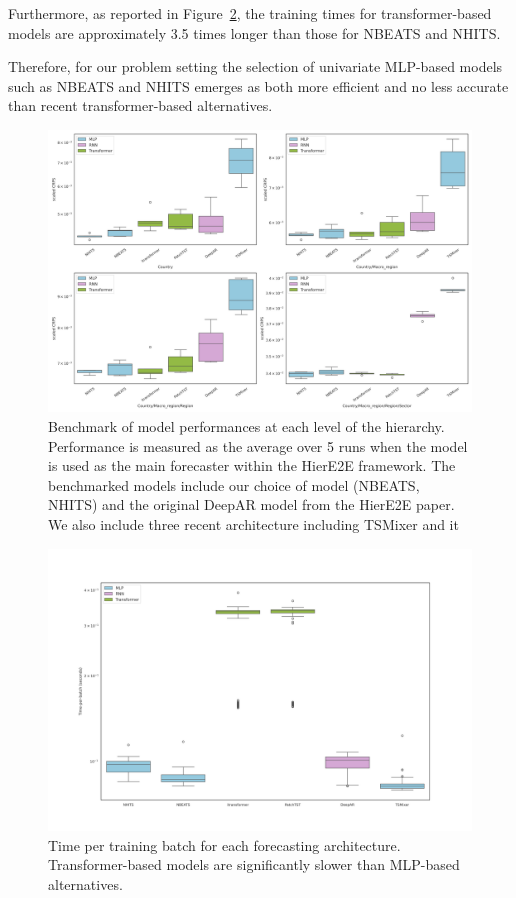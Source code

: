 \documentclass[letterpaper]{article}
\begin{document}
 Furthermore, as reported in Figure~\ref{fig:training_time_comparison}, the training times for transformer-based models are approximately 3.5 times longer than those for NBEATS and NHITS.

Therefore, for our problem setting the selection of univariate MLP-based models such as NBEATS and NHITS emerges as both more efficient and no less accurate than recent transformer-based alternatives.


\begin{figure}[h]
    \centering
    \includegraphics[width=\linewidth]{perf_HierE2E_models.png}
    \caption{Benchmark of model performances at each level of the hierarchy. Performance is measured as the average over 5 runs when the model is used as the main forecaster within the HierE2E framework. The benchmarked models include our choice of model (NBEATS, NHITS) and the original DeepAR model from the HierE2E paper. We also include three recent architecture including TSMixer and it}
    \label{fig:crps_model_comparison}
\end{figure}

\begin{figure}[h]
    \centering
    \includegraphics[width=\linewidth]{perf_time_HierE2E.png}
    \caption{Time per training batch for each forecasting architecture. Transformer-based models are significantly slower than MLP-based alternatives.}
    \label{fig:training_time_comparison}
\end{figure}
\end{document}
